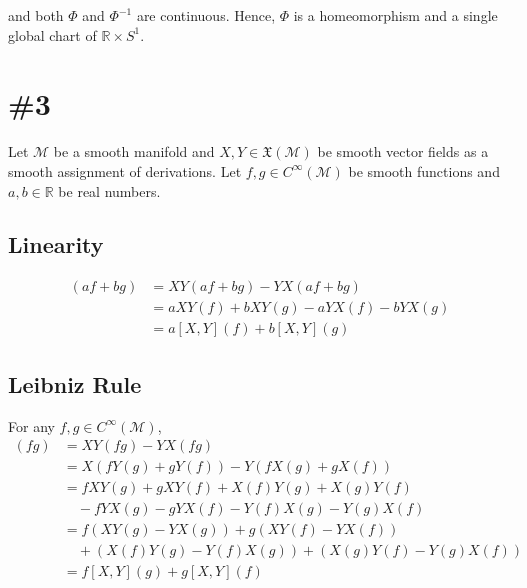 \documentclass[a4paper,11pt]{article}
\begin{document}
and both $\Phi$ and $\Phi^{-1}$ are continuous. Hence, $\Phi$ is a homeomorphism and a single global chart of $\mathbb{R}\times S^1$.


\section{\#3}

Let $\mathcal{M}$ be a smooth manifold and $X, Y\in\mathfrak{X}(\mathcal{M})$ be smooth vector fields as a smooth assignment of derivations. Let $f, g\in C^\infty(\mathcal{M})$ be smooth functions and $a, b\in\mathbb{R}$ be real numbers. 


\subsection{Linearity}

\begin{align}
    [X, Y](af + bg) &= XY(af + bg) - YX(af + bg) \\
    &= aXY(f) + bXY(g) - aYX(f) - bYX(g) \\
    &= a[X, Y](f) + b[X, Y](g)
\end{align}

\subsection{Leibniz Rule}

For any $f, g\in C^\infty(\mathcal{M})$, 
\begin{align}
    [X, Y](fg) &= XY(fg) - YX(fg) \\
    &= X(fY(g) + gY(f)) - Y(fX(g) + gX(f)) \\
    &= fXY(g) + gXY(f) + X(f)Y(g) + X(g)Y(f) \\
    &\quad - fYX(g) - gYX(f) - Y(f)X(g) - Y(g)X(f) \\
    &= f(XY(g) - YX(g)) + g(XY(f) - YX(f)) \\
    &\quad + (X(f)Y(g) - Y(f)X(g)) + (X(g)Y(f) - Y(g)X(f)) \\
    &= f[X, Y](g) + g[X, Y](f)
\end{align}
\end{document}
